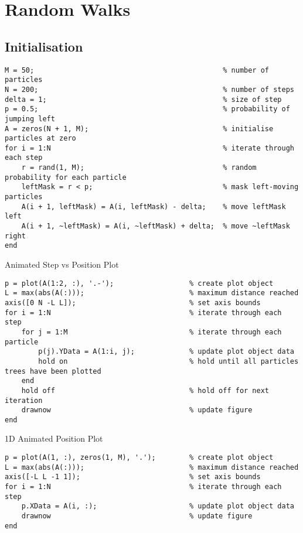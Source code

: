 \documentclass{article}
\begin{document}
\section*{Random Walks}
\subsection*{Initialisation}
\begin{verbatim}
M = 50;                                             % number of particles
N = 200;                                            % number of steps
delta = 1;                                          % size of step
p = 0.5;                                            % probability of jumping left
A = zeros(N + 1, M);                                % initialise particles at zero
for i = 1:N                                         % iterate through each step
    r = rand(1, M);                                 % random probability for each particle
    leftMask = r < p;                               % mask left-moving particles
    A(i + 1, leftMask) = A(i, leftMask) - delta;    % move leftMask left
    A(i + 1, ~leftMask) = A(i, ~leftMask) + delta;  % move ~leftMask right
end
\end{verbatim}
Animated Step vs Position Plot
\begin{verbatim}
p = plot(A(1:2, :), '.-');                  % create plot object
L = max(abs(A(:)));                         % maximum distance reached
axis([0 N -L L]);                           % set axis bounds
for i = 1:N                                 % iterate through each step
    for j = 1:M                             % iterate through each particle
        p(j).YData = A(1:i, j);             % update plot object data
        hold on                             % hold until all particles trees have been plotted
    end
    hold off                                % hold off for next iteration
    drawnow                                 % update figure
end
\end{verbatim}
1D Animated Position Plot
\begin{verbatim}
p = plot(A(1, :), zeros(1, M), '.');        % create plot object
L = max(abs(A(:)));                         % maximum distance reached
axis([-L L -1 1]);                          % set axis bounds
for i = 1:N                                 % iterate through each step
    p.XData = A(i, :);                      % update plot object data
    drawnow                                 % update figure
end
\end{verbatim}
\end{document}
